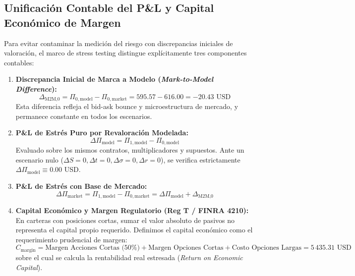 \documentclass[11pt,a4paper]{article}
\begin{document}
\subsection{Unificación Contable del P\&L y Capital Económico de Margen}
Para evitar contaminar la medición del riesgo con discrepancias iniciales de valoración, el marco de stress testing distingue explícitamente tres componentes contables:
\begin{enumerate}
    \item \textbf{Discrepancia Inicial de Marca a Modelo (\textit{Mark-to-Model Difference}):}
    \begin{equation}
        \Delta_{\text{M2M,0}} = \Pi_{0,\text{model}} - \Pi_{0,\text{market}} = 595.57 - 616.00 = -20.43 \text{ USD}
    \end{equation}
    Esta diferencia refleja el bid-ask bounce y microestructura de mercado, y permanece constante en todos los escenarios.
    \item \textbf{P\&L de Estrés Puro por Revaloración Modelada:}
    \begin{equation}
        \Delta \Pi_{\text{model}} = \Pi_{1,\text{model}} - \Pi_{0,\text{model}}
    \end{equation}
    Evaluado sobre los mismos contratos, multiplicadores y supuestos. Ante un escenario nulo ($\Delta S = 0, \Delta t = 0, \Delta \sigma = 0, \Delta r = 0$), se verifica estrictamente $\Delta \Pi_{\text{model}} \equiv 0.00$ USD.
    \item \textbf{P\&L de Estrés con Base de Mercado:}
    \begin{equation}
        \Delta \Pi_{\text{market}} = \Pi_{1,\text{model}} - \Pi_{0,\text{market}} = \Delta \Pi_{\text{model}} + \Delta_{\text{M2M,0}}
    \end{equation}
    \item \textbf{Capital Económico y Margen Regulatorio (Reg T / FINRA 4210):}
    En carteras con posiciones cortas, sumar el valor absoluto de pasivos no representa el capital propio requerido. Definimos el capital económico como el requerimiento prudencial de margen:
    \begin{equation}
        C_{\text{margin}} = \text{Margen Acciones Cortas (50\%)} + \text{Margen Opciones Cortas} + \text{Costo Opciones Largas} = 5\,435.31 \text{ USD}
    \end{equation}
    sobre el cual se calcula la rentabilidad real estresada (\textit{Return on Economic Capital}).
\end{enumerate}
\end{document}
